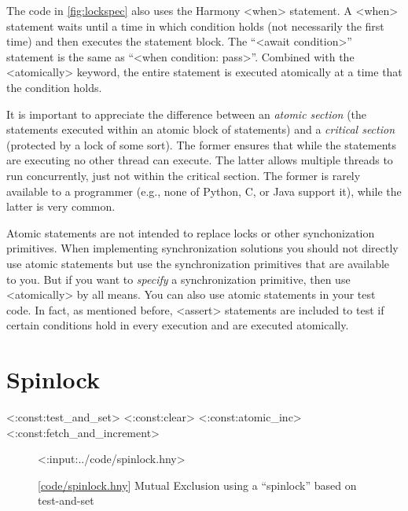 \documentclass{report}
\newcommand{\harmonylink}[1]{%
[\href{https://harmony.cs.cornell.edu/#1}{\underline{#1}}]%
}
\newenvironment{code}{
\tcolorbox
}{
\endtcolorbox
}
\begin{document}
The code in \autoref{fig:lockspec} also uses the Harmony <{when}>
statement.  A <{when}> statement waits until a time in which
condition holds (not necessarily the first time) and then executes the
statement block.  The ``<{await condition}>'' statement is
the same as ``<{when condition: pass}>''.
Combined with the <{atomically}> keyword, the entire statement
is executed atomically at a time that the condition holds.

It is important to appreciate the difference between an
\emph{atomic section} (the statements executed within an
atomic block of statements) and a \emph{critical section}
(protected by a lock of some sort).
The former ensures that while the
statements are executing no other thread can execute.
The latter allows multiple threads to run concurrently,
just not within the critical section.
The former is rarely available to a programmer (e.g., none of
Python, C, or Java support it), while the latter
is very common.

Atomic statements
are not intended to replace locks or other synchonization primitives.
When implementing synchronization solutions you should not directly use
atomic statements but use the synchronization primitives that are available
to you.  But if you want to \emph{specify} a synchronization primitive,
then use <{atomically}> by all means.
You can also use atomic statements in your test code.
In fact, as mentioned before, <{assert}> statements are included to
test if certain conditions hold in every execution and are executed
atomically.

\chapter{Spinlock}
\label{ch:spinlock}
%

<{:const:test_and_set}>
<{:const:clear}>
<{:const:atomic_inc}>
<{:const:fetch_and_increment}>

%

\begin{figure}
\begin{code}
<{:input:../code/spinlock.hny}>
\end{code}
\caption{\harmonylink{code/spinlock.hny} Mutual Exclusion using a ``spinlock'' based on test-and-set}
\label{fig:tas}
\end{figure}
\end{document}
